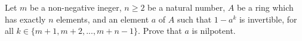 Let $ m $ be a non-negative ineger, $ n\ge 2 $ be a natural number, $ A $ be a ring which has exactly $ n $ elements, and an element $ a $ of $ A $ such that $ 1-a^k $ is invertible, for all $ k\in\{ m+1,m+2,...,m+n-1\} . $
Prove that $ a $ is nilpotent.